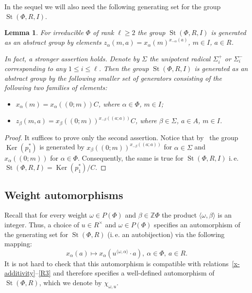 \documentclass[oneside, 10pt]{amsart}
\DeclareMathOperator{\St}{St}
\DeclareMathOperator{\Ker}{Ker}
\newcommand{\ZZ}{\mathbb{Z}}
\numberwithin{equation}{section}
\numberwithin{thm}{section}
\newtheorem{lemma}[thm]{Lemma}
\numberwithin{lemma}{section}
\theoremstyle{definition}
\theoremstyle{remark}
\begin{document}
In the sequel we will also need the following generating set for the group $\St(\Phi, R, I)$.
\begin{lemma}\label{lem:relative-generators}
For irreducible $\Phi$ of rank $\ell \geq 2$ the group $\St(\Phi, R, I)$ is generated as an abstract group by elements $z_\alpha(m, a) = x_\alpha(m)^{x_{-\alpha}(a)}$, $m \in I$, $a \in R$.

In fact, a stronger assertion holds.
Denote by $\Sigma$ the unipotent radical $\Sigma^+_i$ or $\Sigma^-_i$ corresponding to any $1 \leq i \leq \ell$.
Then the group $\St(\Phi, R, I)$ is generated as an abstract group by the following smaller set of generators consisting of the following two families of elements:
\begin{itemize}
\item $x_{\alpha}(m) = x_\alpha((0; m))C$, where $\alpha \in \Phi$, $m \in I$;
\item $z_{\beta}(m, a) = x_\beta((0; m))^{x_{-\beta}((a; a))}C$, where $\beta \in \Sigma$, $a \in A$, $m \in I$.
\end{itemize}
\end{lemma}
\begin{proof}
It suffices to prove only the second assertion.
Notice that by~\cite[Lemma~4]{S15} the group $\Ker(p_1^*)$ is generated by $x_{\beta}((0; m))^{x_{-\beta}((a; a))}$ for $\alpha \in \Sigma$ and $x_{\alpha}((0; m))$ for $\alpha \in \Phi$.
Consequently, the same is true for $\St(\Phi, R, I)$ i.\,e. $\St(\Phi, R, I) = \Ker(p_1^*)/C$.
\end{proof}

\subsection{Weight automorphisms}\label{subsec:weight-automorphisms}
Recall that for every weight $\omega \in P(\Phi)$ and $\beta \in \ZZ \Phi$ the product $\langle \omega, \beta\rangle$ is an integer.
Thus, a choice of $u \in R^\times$ and $\omega \in P(\Phi)$ specifies an automorphism of the generating set for $\St(\Phi, R)$ (i.\,e. an autobijection) via the following mapping:
\begin{equation}\label{eq:chi-def} x_\alpha(a) \mapsto x_\alpha(u^{\langle\omega, \alpha\rangle} \cdot a),\ \alpha\in \Phi,\ a \in R. \end{equation}
It is not hard to check that this automorphism is compatible with relations~\eqref{x-additivity}--\eqref{R3} and therefore specifies a well-defined automorphism of $\St(\Phi, R)$, which we denote by $\chi_{\omega, u}$.
\end{document}
